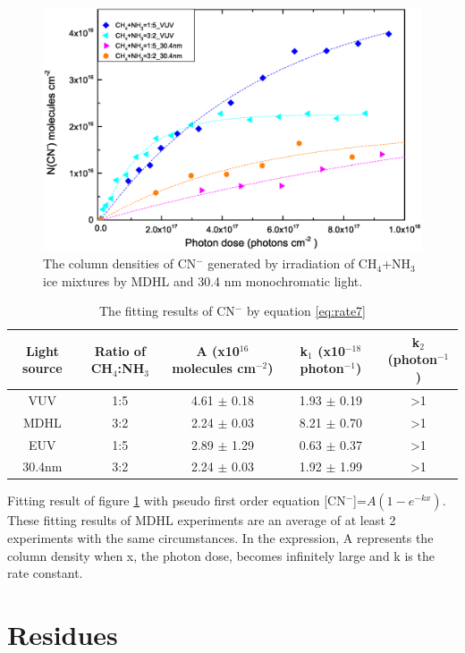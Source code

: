 \begin{figure}
\centering
\includegraphics[width=\textwidth]{figures/chapter3/overall_CN_NSRRC.eps}
\caption{The column densities of CN$^-$ generated by irradiation of CH$_4$+NH$_3$ ice mixtures by MDHL and 30.4 nm monochromatic light.}
\label{fig:CN_NSRRC}
\end{figure}

\begin{table}[htbp]
\caption{The fitting results of CN$^-$ by equation \ref{eq:rate7}}
\label{tab:CNrate_NSRRC}
\begin{tabular}{ccccc}
\hline
\hline
Light source & Ratio of CH$_4$:NH$_3$ & A (x10$^{16}$ molecules cm$^{-2}$) & k$_1$ (x10$^{-18}$ photon$^{-1}$) & k$_2$ (photon$^{-1}$)\\
\hline
VUV & 1:5 & 4.61 $\pm$ 0.18 & 1.93 $\pm$ 0.19 & >1 \\
MDHL & 3:2 & 2.24 $\pm$ 0.03 & 8.21 $\pm$ 0.70 & >1 \\
\hline
EUV & 1:5 & 2.89 $\pm$ 1.29 & 0.63 $\pm$ 0.37 & >1 \\
 30.4nm & 3:2 & 2.24 $\pm$ 0.03 & 1.92 $\pm$ 1.99 & >1 \\
\hline
\end{tabular}
Fitting result of figure \ref{fig:CN_NSRRC} with pseudo first order equation [CN$^-$]=$A(1-e^{-kx})$. These fitting results of MDHL experiments are an average of at least 2 experiments with the same circumstances. In the expression, A represents the column density when x, the photon dose, becomes infinitely large and k is the rate constant.\
\end{table}


\section{Residues}

